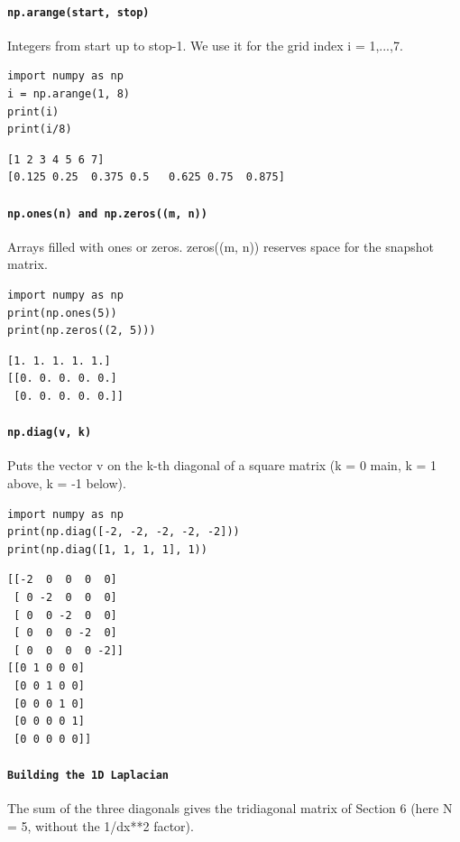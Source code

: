 \paragraph{\texttt{np.arange(start, stop)}} Integers from start up to stop-1. We use it for the grid index i = 1,...,7.

\begin{lstlisting}[style=py]
import numpy as np
i = np.arange(1, 8)
print(i)
print(i/8)
\end{lstlisting}

\begin{lstlisting}[style=out]
[1 2 3 4 5 6 7]
[0.125 0.25  0.375 0.5   0.625 0.75  0.875]
\end{lstlisting}

\paragraph{\texttt{np.ones(n) and np.zeros((m, n))}} Arrays filled with ones or zeros. zeros((m, n)) reserves space for the snapshot matrix.

\begin{lstlisting}[style=py]
import numpy as np
print(np.ones(5))
print(np.zeros((2, 5)))
\end{lstlisting}

\begin{lstlisting}[style=out]
[1. 1. 1. 1. 1.]
[[0. 0. 0. 0. 0.]
 [0. 0. 0. 0. 0.]]
\end{lstlisting}

\paragraph{\texttt{np.diag(v, k)}} Puts the vector v on the k-th diagonal of a square matrix (k = 0 main, k = 1 above, k = -1 below).

\begin{lstlisting}[style=py]
import numpy as np
print(np.diag([-2, -2, -2, -2, -2]))
print(np.diag([1, 1, 1, 1], 1))
\end{lstlisting}

\begin{lstlisting}[style=out]
[[-2  0  0  0  0]
 [ 0 -2  0  0  0]
 [ 0  0 -2  0  0]
 [ 0  0  0 -2  0]
 [ 0  0  0  0 -2]]
[[0 1 0 0 0]
 [0 0 1 0 0]
 [0 0 0 1 0]
 [0 0 0 0 1]
 [0 0 0 0 0]]
\end{lstlisting}

\paragraph{\texttt{Building the 1D Laplacian}} The sum of the three diagonals gives the tridiagonal matrix of Section 6 (here N = 5, without the 1/dx**2 factor).

